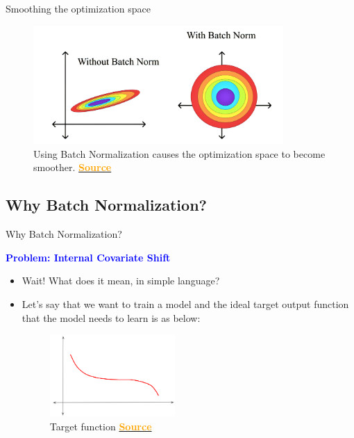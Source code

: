\documentclass[serif, aspectratio=169]{beamer}
\begin{document}
\begin{frame}{Smoothing the optimization space}

        \begin{figure}
        \includegraphics[width=0.85\textwidth]{pic/BatchNorm_Effect.png}
        \caption{Using Batch Normalization causes the optimization space to become smoother. \href{https://www.linkedin.com/pulse/ways-improve-your-deep-learning-model-batch-adam-albuquerque-lima}{\textcolor{orange}{\textbf{Source}}}}
        \label{fig:BN_Effect1}
    \end{figure}

\end{frame}

\subsection{Why Batch Normalization?}

\begin{frame}{Why Batch Normalization?}

    \textcolor{blue}{\textbf{Problem: Internal Covariate Shift}}

\begin{itemize}

    \item Wait! What does it mean, in simple language?
    \item Let’s say that we want to train a model and the ideal target output function that the model needs to learn is as below:

    \begin{figure}
        \includegraphics[width=0.45\textwidth]{pic/ICS-1.png}
        \caption{Target function \href{https://ketanhdoshi.github.io/assets/images/BatchNorm/ICS-1.png}{\textcolor{orange}{\textbf{Source}}}}
        \label{fig:Target_function}
    \end{figure}

\end{itemize}

\end{frame}
\end{document}
